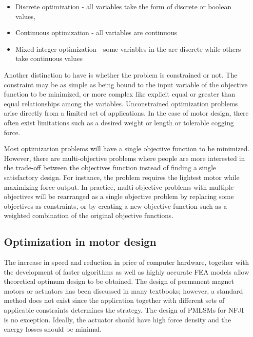         \begin{itemize}
            \item Discrete optimization - all variables take the form of discrete or boolean values,
            \item Continuous optimization - all variables are continuous
            \item Mixed-integer optimization - some variables in the are discrete while others take continuous values
        \end{itemize}
   
        Another distinction to have is whether the problem is constrained or not. The constraint may be as simple as being bound to the input variable of the objective function to be minimized, or more complex like explicit equal or greater than equal relationships among the variables. Unconstrained optimization problems arise directly from a limited set of applications. In the case of motor design, there often exist limitations such as a desired weight or length or tolerable cogging force.
        
        
        Most optimization problems will have a single objective function to be minimized. However, there are multi-objective problems where people are more interested in the trade-off between the objectives function instead of finding a single satisfactory design. For instance, the problem requires the lightest motor while maximizing force output. In practice, multi-objective problems with multiple objectives will be rearranged as a single objective problem by replacing some objectives as constraints, or by creating a new objective function such as a weighted combination of the original objective functions.
        

    \subsection{Optimization in motor design}        \label{Chapter:background/optimization methods/optimization in motor design}
    
    
        The increase in speed and reduction in price of computer hardware, together with the development of faster algorithms as well as highly accurate \acs{FEA} models allow theoretical optimum design to be obtained. The design of permanent magnet motors or actuators has been discussed in many textbooks; however, a standard method does not exist since the application together with different sets of applicable constraints determines the strategy. The design of \acsp{PMLSM} for \acs{NFJI} is no exception. Ideally, the actuator should have high force density and the energy losses should be minimal. 
    
